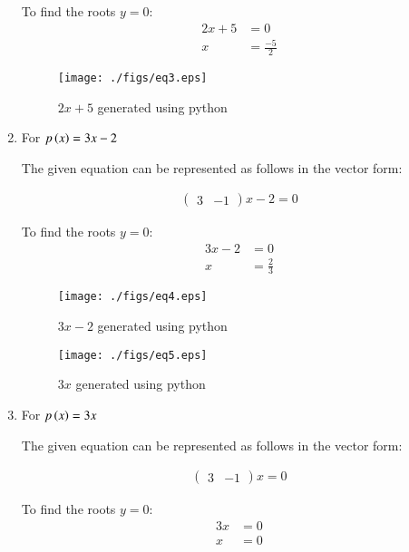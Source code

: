 \begin{enumerate}[label=\thesection.\arabic*.,ref=\thesection.\theenumi]
To find the roots $y=0$:
\begin{align}
2x + 5 &= 0 \\
x &= \frac{-5}{2}
\end{align}
\begin{figure}[!ht]
\centering
\texttt{[image: ./figs/eq3.eps]}
\caption{$2x + 5$ generated using python}
\label{fig:eq3}
\end{figure} 
\item \solution For $p\left(x\right) = 3x - 2$
\begin{flushleft}
The given equation can be represented as follows in the vector form:
\end{flushleft}
\begin{align}
\begin{pmatrix}
3 & -1 
\end{pmatrix}
x - 2 = 0
\end{align}

To find the roots $y=0$:
\begin{align}
3x - 2 &= 0 \\
x &= \frac{2}{3}
\end{align}
\begin{figure}[!ht]
\centering
\texttt{[image: ./figs/eq4.eps]}
\caption{$3x - 2$ generated using python}
\label{fig:eq4}
\end{figure} 
\begin{figure}[!ht] 
\centering
\texttt{[image: ./figs/eq5.eps]}
\caption{$3x$ generated using python}
\label{fig:eq5}
\end{figure} 
\item \solution For $p\left(x\right) = 3x$
\begin{flushleft}
The given equation can be represented as follows in the vector form:
\end{flushleft}
\begin{align}
\begin{pmatrix}
3 & -1 
\end{pmatrix}
x  = 0
\end{align}

To find the roots $y=0$:
\begin{align}
3x  &= 0 \\
x &= 0
\end{align}

\end{enumerate}
